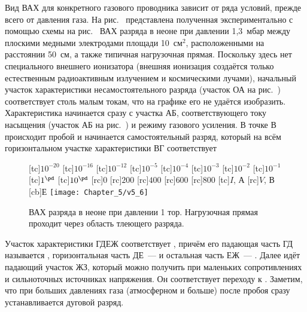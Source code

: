Вид ВАХ для конкретного газового проводника зависит от ряда условий, прежде всего от давления газа. На рис.~
представлена полученная экспериментально с помощью схемы на рис.~ ВАХ разряда в неоне при давлении 1,3~мбар между плоскими
медными электродами площади 10~см$^2$, расположенными на расстоянии 50~см, а также типичная нагрузочная прямая. Поскольку
здесь нет специального внешнего ионизатора (внешняя ионизация создаётся только естественным радиоактивным излучением и
космическими лучами), начальный участок характеристики несамостоятельного разряда (участок ОА на рис.~) соответствует
столь малым токам, что на графике его не удаётся изобразить. Характеристика начинается сразу с участка АБ,
соответствующего току насыщения (участок АБ на рис.~) и режиму газового усиления. В точке В происходит пробой и
начинается самостоятельный разряд, который на всём горизонтальном участке характеристики ВГ соответствует 

\begin{figure}[h!]
	\centering
	[tc]{\footnotesize $10^{-20}$}
	[tc]{\footnotesize $10^{-16}$}
	[tc]{\footnotesize $10^{-12}$}
	[tc]{\footnotesize $10^{-5}$}
	[tc]{\footnotesize $10^{-4}$}
	[tc]{\footnotesize $10^{-3}$}
	[tc]{\footnotesize $10^{-2}$}
	[tc]{\footnotesize $10^{-1}$}
	[tc]{\footnotesize $1^{\pd}$}
	[tc]{\footnotesize $10^{\pd}$}
	[rc]{\footnotesize $0$}
	[rc]{\footnotesize $200$}
	[rc]{\footnotesize $400$}
	[rc]{\footnotesize $600$}
	[rc]{\footnotesize $800$}
	[tc]{$I$, А}
	[rc]{$V$, В}
	[cb]{Е}
	\texttt{[image: Chapter\_5/v5\_6]}
	\caption{ВАХ разряда в неоне при давлении 1 тор. Нагрузочная прямая проходит через область тлеющего разряда.}
\end{figure}

Участок характеристики ГДЕЖ соответствует , причём его падающая часть ГД называется
, горизонтальная часть ДЕ~---  и остальная часть
ЕЖ~--- . Далее идёт падающий участок ЖЗ, который можно получить при маленьких
сопротивлениях и сильноточных источниках напряжения. Он соответствует переходу к . Заметим, что
при больших давлениях газа (атмосферном и больше) после пробоя сразу устанавливается дуговой разряд.

